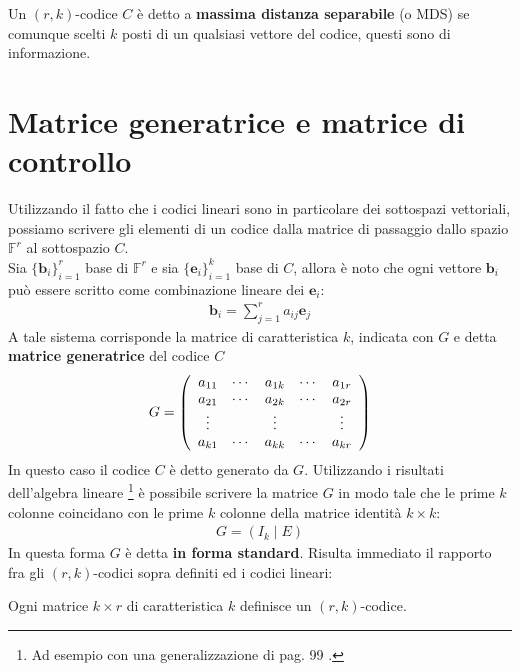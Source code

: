\begin{definizione}
   Un $(r,k)$-codice $C$ è detto a {\bf massima distanza separabile} (o MDS) se comunque scelti $k$ posti di un qualsiasi vettore del codice, questi sono di informazione.
\end{definizione}


\section{Matrice generatrice e matrice di controllo}

Utilizzando il fatto che i codici lineari sono in particolare dei sottospazi vettoriali, possiamo scrivere gli elementi di un codice dalla matrice di passaggio dallo spazio $\mathbb{F}^{r} $ al sottospazio $C$. \\
Sia $\lbrace \mathbf{b}_{i} \rbrace_{i=1}^{r}$ base di $\mathbb{F}^{r}$ e sia $\lbrace \mathbf{e}_{i} \rbrace_{i=1}^{k}$ base di $C$, allora è noto che ogni vettore $\mathbf{b}_{i}$ può essere scritto come combinazione lineare dei $\mathbf{e}_{i}$:
\begin{align*}
   \mathbf{b}_{i} = \sum_{j=1}^{r} a_{ij} \mathbf{e}_{j}
\end{align*}
A tale sistema corrisponde la matrice di caratteristica $k$, indicata con $G$ e detta {\bf matrice generatrice} del codice $C$
\begin{align*}
  G =
  \left(
  \begin{array} {c c c c c}
  a_{11} & \cdots & a_{1k} & \cdots & a_{1r} \\
  a_{21} & \cdots & a_{2k} & \cdots & a_{2r} \\
  \vdots &  & \vdots & & \vdots \\
  a_{k1} & \cdots & a_{kk} & \cdots & a_{kr}
  \end{array}
  \right)
\end{align*}
In questo caso il codice $C$ è detto generato da $G$.
Utilizzando i risultati dell'algebra lineare
\footnote{Ad esempio con una generalizzazione di pag. 99 \cite{stoka}.}
è possibile scrivere la matrice $G$ in modo tale che le prime $k$ colonne coincidano con le prime $k$ colonne della matrice identità $k\times k$:
\begin{align*}
   G = (I_{k} \mid E)
\end{align*}
In questa forma $G$ è detta {\bf in forma standard}.
Risulta immediato il rapporto fra gli $(r,k)$-codici sopra definiti ed i codici lineari:
\begin{teorema}
   Ogni matrice $k\times r$ di caratteristica $k$ definisce un $(r,k)$-codice.
\end{teorema}
